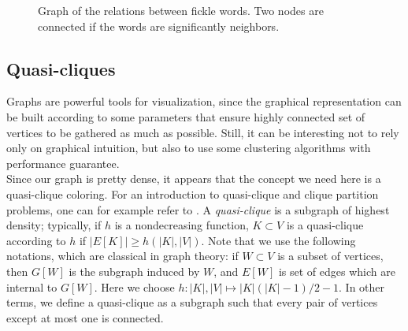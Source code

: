 \documentclass[preprint]{elsarticle}
\begin{document}
\begin{figure}[h!]

\caption{Graph of the relations between fickle words. Two nodes are connected if the words are significantly neighbors.}
\label{fig:graph1}
\end{figure}

\subsection{Quasi-cliques}

Graphs are powerful tools for visualization, since the graphical representation can be built according to some parameters that ensure highly connected set of vertices to be gathered as much as possible. Still, it can be interesting not to rely only on graphical intuition, but also to use some clustering algorithms with performance guarantee.\\

Since our graph is pretty dense, it appears that the concept we need here is a quasi-clique coloring. For an introduction to quasi-clique and clique partition problems, one can for example refer to \cite{AJLR10}. A \textit{quasi-clique} is a subgraph of highest density; typically, if $h$ is a nondecreasing function, $K \subset V$ is a quasi-clique according to $h$ if $|E[K]| \geq h(|K|,|V|)$. Note that we use the following notations, which are classical in graph theory: if $W\subset V$ is a subset of vertices, then $G[W]$ is the subgraph induced by $W$, and $E[W]$ is set of edges which are internal to $G[W]$. Here we choose $h:|K|,|V|\mapsto|K|(|K|-1)/2-1$. In other terms, we define a quasi-clique as a subgraph such that every pair of vertices except at most one is connected.\\
\end{document}
